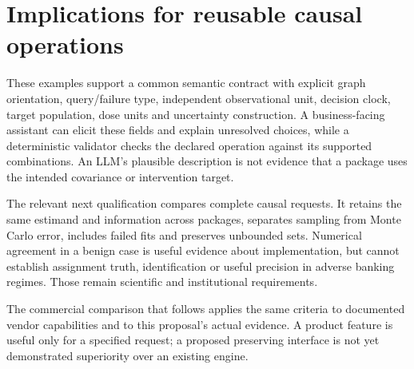 \section{Implications for reusable causal operations}

These examples support a common semantic contract with explicit graph
orientation, query/failure type, independent observational unit, decision clock,
target population, dose units and uncertainty construction. A business-facing
assistant can elicit these fields and explain unresolved choices, while a
deterministic validator checks the declared operation against its supported
combinations. An LLM's plausible description is not evidence that a package
uses the intended covariance or intervention target.

The relevant next qualification compares complete causal requests. It retains
the same estimand and information across packages, separates sampling from
Monte Carlo error, includes failed fits and preserves unbounded sets. Numerical
agreement in a benign case is useful evidence about implementation, but cannot
establish assignment truth, identification or useful precision in adverse
banking regimes. Those remain scientific and institutional requirements.


The commercial comparison that follows applies the same criteria to documented
vendor capabilities and to this proposal's actual evidence. A product feature
is useful only for a specified request; a proposed preserving interface is not
yet demonstrated superiority over an existing engine.
